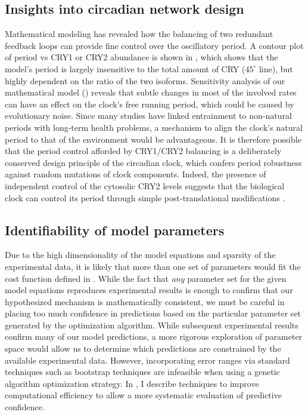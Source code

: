 \subsection{Insights into circadian network design}
Mathematical modeling has revealed how the balancing of two redundant feedback loops can provide fine control over the oscillatory period. 
A contour plot of period vs CRY1 or CRY2 abundance is shown in , which shows that the model's period is largely insensitive to the total amount of CRY ($45^\circ$ line), but highly dependent on the ratio of the two isoforms. 
Sensitivity analysis of our mathematical model () reveals that subtle changes in most of the involved rates can have an effect on the clock's free running period, which could be caused by evolutionary noise. 
Since many studies have linked entrainment to non-natural periods with long-term health problems, a mechanism to align the clock’s natural period to that of the environment would be advantageous. 
It is therefore possible that the period control afforded by CRY1/CRY2 balancing is a deliberately conserved design principle of the circadian clock, which confers period robustness against random mutations of clock components. 
Indeed, the presence of independent control of the cytosolic CRY2 levels suggests that the biological clock can control its period through simple post-translational modifications \cite{Kurabayashi2010}. 

\subsection{Identifiability of model parameters}
Due to the high dimensionality of the model equations and sparsity of the experimental data, it is likely that more than one set of parameters would fit the cost function defined in . 
While the fact that {\itshape any} parameter set for the given model equations reproduces experimental results is enough to confirm that our hypothesized mechanism is mathematically consistent, we must be careful in placing too much confidence in predictions based on the particular parameter set generated by the optimization algorithm. 
While subsequent experimental results confirm many of our model predictions, a more rigorous exploration of parameter space would allow us to determine which predictions are constrained by the available experimental data. 
However, incorporating error ranges via standard techniques such as bootstrap techniques are infeasible when using a genetic algorithm optimization strategy. 
In , I describe techniques to improve computational efficiency to allow a more systematic evaluation of predictive confidence.
